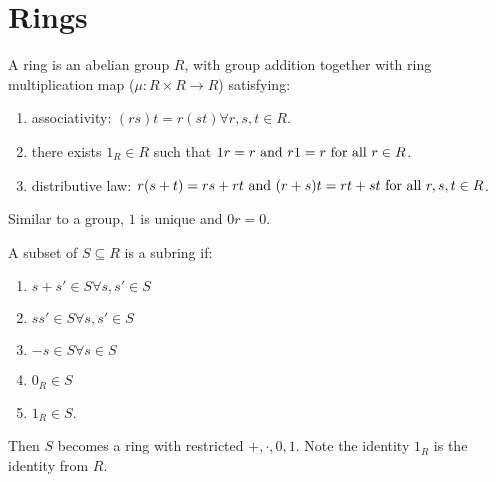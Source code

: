 \section{Rings}

\begin{definition}[Ring]
    A ring is an abelian group \(R\), with group addition together with ring multiplication map (\(\mu: R \times R \to R\)) satisfying:
    \begin{enumerate}
        \item associativity: \((rs)t = r(st) \forall r,s,t \in R\).
        \item there exists \(1_R \in R\) such that \(1r = r \text{ and } r1 = r \text{ for all } r \in R\).
        \item distributive law: \(r(s + t) = rs + rt \text{ and } (r + s) t = rt + st \text{ for all } r, s, t \in R\).
    \end{enumerate}
    Similar to a group, \(1\) is unique and \(0r = 0\).
\end{definition}



\begin{prop-defn}[Subrings]
A subset of \(S \subseteq R\) is a subring if:
\begin{enumerate}
    \item \(s + s' \in S \forall s, s' \in S\)
    \item \(ss' \in S \forall s, s' \in S\)
    \item \(-s \in S \forall s \in S\)
    \item \(0_R \in S\)
    \item \(1_R \in S\).
\end{enumerate}
Then \(S\) becomes a ring with restricted \(+, \cdot, 0, 1\). Note the identity \(1_R\) is the identity from \(R\).
\end{prop-defn}



